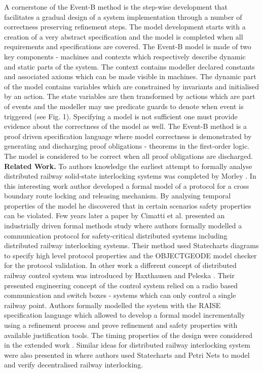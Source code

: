 \documentclass{llncs}
\begin{document}
A cornerstone of the Event-B method is the step-wise development that facilitates a gradual design of a system implementation through a number of correctness preserving refinement steps. The model development starts with a creation of a very abstract specification and the model is completed
when all requirements and specifications are covered. The Event-B model is made of two key components - machines and contexts which respectively describe dynamic and static parts of the system. The context contains modeller
declared constants and associated axioms which can be made visible in machines. The dynamic part of the model contains
variables which are constrained by invariants and initialised by an action. The state variables are then transformed by actions which are part of events and the modeller may use predicate
guards to denote when event is triggered (see Fig. 1). Specifying a model is not sufficient one must provide evidence about the correctness of the model as well. The Event-B
method is a proof driven specification language where model  correctness is demonstrated by generating and discharging
proof obligations - theorems in the first-order logic. The model is considered to be correct when all proof obligations
are discharged. \\





\noindent \textbf{Related Work.} To authors knowledge the earliest attempt to formally analyse distributed railway solid-state interlocking systems was completed by Morley \cite{morley1996safety}. In this interesting work author developed a formal model of a protocol for a cross boundary route locking and releasing mechanism. By analysing temporal properties of the model he discovered that in certain scenarios safety properties can be violated. Few years later a paper by Cimatti et al. \cite{cimatti1999formal} presented an industrially driven formal methods study where authors formally modelled a communication protocol for safety-critical distributed systems including distributed railway interlocking systems. Their method used Statecharts diagrams to specify high level protocol properties and the \scriptsize{OBJECT}\normalsize{GEODE} model checker for the protocol validation. In other work a different concept of distributed railway control system was introduced by Haxthausen and Peleska \cite{haxthausen2000formal}. Their presented engineering concept of the control system relied on a radio based communication and switch boxes - systems which can only control a single railway point. Authors formally modelled the system with the RAISE \cite{george1995raise} specification language  which allowed to develop a formal model incrementally using a refinement process and prove refinement and safety properties with available justification tools. The timing properties of the design were considered in the extended work \cite{madsen2005modelling}. Similar ideas for distributed railway interlocking system were also presented in \cite{banci2004role, hei2008toward} where authors used Statecharts and Petri Nets to model and verify decentralised railway interlocking. 
\end{document}
